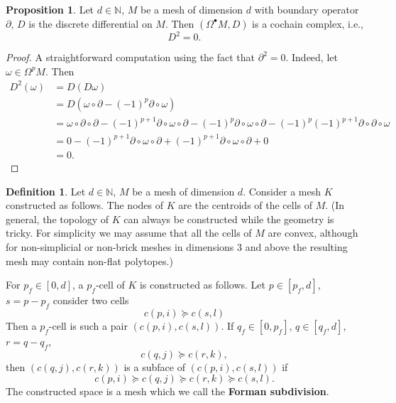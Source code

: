 \documentclass[fleqn]{article}
\theoremstyle{definition}
\newtheorem{proposition}[theorem]{Proposition}
\newtheorem{definition}[theorem]{Definition}
\begin{document}
\begin{proposition}
  Let $d \in \mathbb{N}$, $M$ be a mesh of dimension $d$ with boundary operator
  $\partial$, $D$ is the discrete differential on $M$.
  Then $(\Omega^\bullet M, D)$ is a cochain complex, i.e.,
  \begin{equation}
    D^2 = 0.
  \end{equation}
\end{proposition}

\begin{proof}
  A straightforward computation using the fact that $\partial^2 = 0$.
  Indeed, let $\omega \in \Omega^p M$.
  Then
  \begin{equation}
    \begin{split}
      D^2(\omega)
      & = D(D \omega) \\
      & = D(\omega \circ \partial - (-1)^p \partial \circ \omega) \\
      & =
      \omega \circ \partial \circ \partial
        - (-1)^{p + 1} \partial \circ \omega \circ \partial
        - (-1)^p \partial \circ \omega \circ \partial
        - (-1)^p (-1)^{p + 1} \partial \circ \partial \circ \omega \\
      & =
      0 
      - (-1)^{p + 1}\partial \circ \omega \circ \partial
      + (-1)^{p + 1}\partial \circ \omega \circ \partial
      + 0 \\
      & = 0.
    \end{split}
  \end{equation}
\end{proof}

\begin{definition}
  Let $d \in \mathbb{N}$, $M$ be a mesh of dimension $d$.
  Consider a mesh $K$ constructed as follows.
  The nodes of $K$ are the centroids of the cells of $M$.
  (In general, the topology of $K$ can always be constructed while the geometry
  is tricky.
  For simplicity we may assume that all the cells of $M$ are convex,
  although for non-simplicial or non-brick meshes in dimensions $3$ and above
  the resulting mesh may contain non-flat polytopes.)

  For $p_f \in [0, d]$, a $p_f$-cell of $K$ is constructed as follows.
  Let $p \in [p_f, d]$, $s = p - p_f$ consider two cells
  \begin{equation}
    c(p, i) \succeq c(s, l)
  \end{equation}
  Then a $p_f$-cell is such a pair $(c(p, i), c(s, l))$.
  If $q_f \in [0, p_f]$, $q \in [q_f, d]$, $r = q - q_f$,
  \begin{equation}
    c(q, j) \succeq c(r, k),
  \end{equation}
  then $(c(q, j), c(r, k))$ is a subface of $(c(p, i), c(s, l))$ if
  \begin{equation}
    c(p, i) \succeq c(q, j) \succeq c(r, k) \succeq c(s, l).
  \end{equation}
  The constructed space is a mesh which we call the \textbf{Forman subdivision}.
\end{definition}
\end{document}
